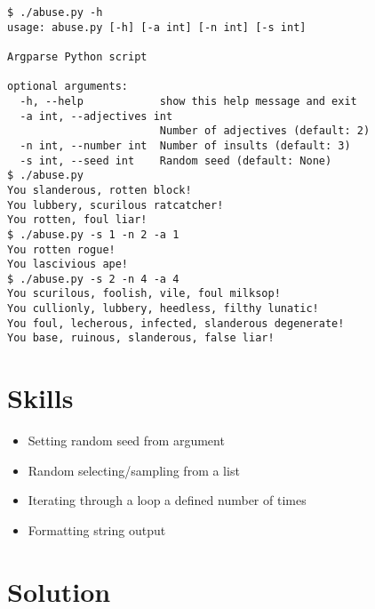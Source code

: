 \documentclass[]{article}
\providecommand{\tightlist}{%
  \setlength{\itemsep}{0pt}\setlength{\parskip}{0pt}}
\begin{document}
\begin{verbatim}
$ ./abuse.py -h
usage: abuse.py [-h] [-a int] [-n int] [-s int]

Argparse Python script

optional arguments:
  -h, --help            show this help message and exit
  -a int, --adjectives int
                        Number of adjectives (default: 2)
  -n int, --number int  Number of insults (default: 3)
  -s int, --seed int    Random seed (default: None)
$ ./abuse.py
You slanderous, rotten block!
You lubbery, scurilous ratcatcher!
You rotten, foul liar!
$ ./abuse.py -s 1 -n 2 -a 1
You rotten rogue!
You lascivious ape!
$ ./abuse.py -s 2 -n 4 -a 4
You scurilous, foolish, vile, foul milksop!
You cullionly, lubbery, heedless, filthy lunatic!
You foul, lecherous, infected, slanderous degenerate!
You base, ruinous, slanderous, false liar!
\end{verbatim}

\hypertarget{skills-1}{%
\section{Skills}\label{skills-1}}

\begin{itemize}
\tightlist
\item
  Setting random seed from argument
\item
  Random selecting/sampling from a list
\item
  Iterating through a loop a defined number of times
\item
  Formatting string output
\end{itemize}

\pagebreak

\hypertarget{solution-11}{%
\section{Solution}\label{solution-11}}
\end{document}
